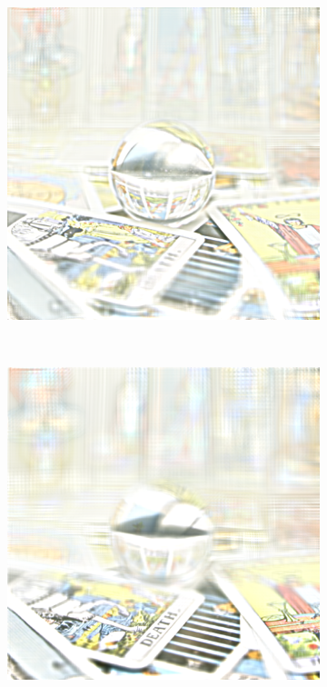 \documentclass[11pt,a4paper,titlepage]{article}
\begin{document}
\begin{figure}
\begin{subfigure}[t]{0.19\textwidth}
	\end{subfigure}%
	~
	\begin{subfigure}[t]{0.19\textwidth}
		\includegraphics[width=\textwidth]{results/tile_blending/tarot6x6x512x512-512x512x5-sampling=2x_tileRes=200x200_overlap=0.5/4.png}
	\end{subfigure}%
	~
	\begin{subfigure}[t]{0.19\textwidth}
		\includegraphics[width=\textwidth]{results/tile_blending/tarot6x6x512x512-512x512x5-sampling=2x_tileRes=200x200_overlap=0.5/5.png}
	\end{subfigure}%
	

\end{figure}
\end{document}
